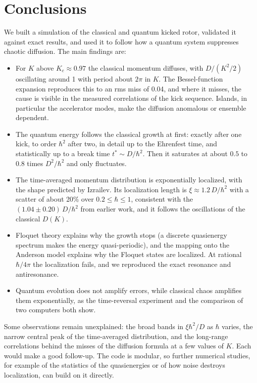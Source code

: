 \section{Conclusions}
\label{sec:conclusions}

We built a simulation of the classical and quantum kicked rotor, validated it against exact results, and
used it to follow how a quantum system suppresses chaotic diffusion. The main findings are:
\begin{itemize}
  \item For $K$ above $K_c \approx 0.97$ the classical momentum diffuses, with $D/(K^2/2)$ oscillating around 1
  with period about $2\pi$ in $K$. The Bessel-function expansion reproduces this to an rms miss of 0.04, and
  where it misses, the cause is visible in the measured correlations of the kick sequence. Islands, in
  particular the accelerator modes, make the diffusion anomalous or ensemble dependent.
  \item The quantum energy follows the classical growth at first: exactly after one kick, to order $\hbar^2$
  after two, in detail up to the Ehrenfest time, and statistically up to a break time $t^* \sim D/\hbar^2$.
  Then it saturates at about $0.5$ to $0.8$ times $D^2/\hbar^2$ and only fluctuates.
  \item The time-averaged momentum distribution is exponentially localized, with the shape predicted by
  Izrailev. Its localization length is $\xi \approx 1.2\,D/\hbar^2$ with a scatter of about 20\% over
  $0.2 \le \hbar \le 1$, consistent with the $(1.04 \pm 0.20)\,D/\hbar^2$ from earlier work, and it follows the
  oscillations of the classical $D(K)$.
  \item Floquet theory explains why the growth stops (a discrete quasienergy spectrum makes the energy
  quasi-periodic), and the mapping onto the Anderson model explains why the Floquet states are localized.
  At rational $\hbar/4\pi$ the localization fails, and we reproduced the exact resonance and antiresonance.
  \item Quantum evolution does not amplify errors, while classical chaos amplifies them exponentially, as the
  time-reversal experiment and the comparison of two computers both show.
\end{itemize}

Some observations remain unexplained: the broad bands in $\xi\hbar^2/D$ as $\hbar$ varies, the narrow central
peak of the time-averaged distribution, and the long-range correlations behind the misses of the diffusion
formula at a few values of $K$. Each would make a good follow-up. The code is modular, so further numerical
studies, for example of the statistics of the quasienergies or of how noise destroys localization, can build
on it directly.

